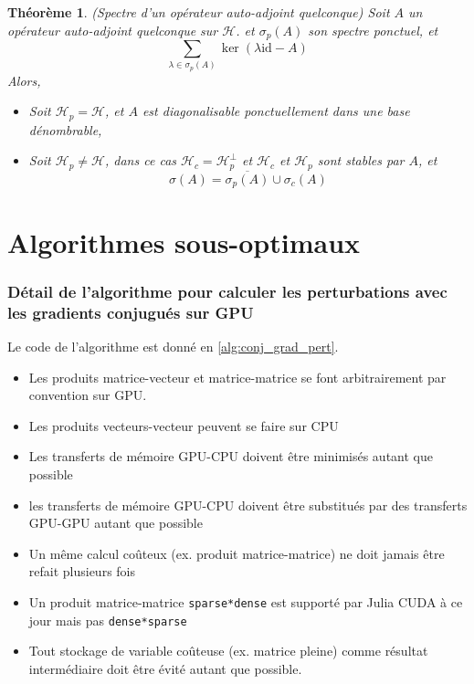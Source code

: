 \documentclass[svgnames,dvipsnames,a4paper,10pt,french]{report}
\newtheorem{theorem}{Théorème}[section]
\begin{document}
\begin{appendices}
\begin{theorem}{(Spectre d'un opérateur auto-adjoint quelconque)}
Soit $A$ un opérateur auto-adjoint quelconque  sur $\mathcal{H}$. et $\sigma_p(A)$ son spectre ponctuel, et
\begin{equation}
    \sum_{\lambda\in\sigma_p(A)} \ker (\lambda \mathrm{id}-A)
\end{equation}
Alors,
\begin{itemize}
    \item Soit $\mathcal{H}_p = \mathcal{H}$, et $A$ est diagonalisable ponctuellement dans une base dénombrable,
    \item Soit $\mathcal{H}_p \neq \mathcal{H}$, dans ce cas $\mathcal{H}_c = \mathcal{H}_p^\perp$ et $\mathcal{H}_c$ et $\mathcal{H}_p$ sont stables par $A$, et 
    \begin{equation}
        \sigma(A) = \overline{\sigma_p(A)} \cup \sigma_c(A)
    \end{equation}
\end{itemize}
\end{theorem}


\chapter{Algorithmes sous-optimaux}

\subsection{Détail de l'algorithme pour calculer les perturbations avec les gradients conjugués sur GPU}

Le code de l'algorithme est donné en \ref{alg:conj_grad_pert}.
\begin{itemize}
    \item Les produits matrice-vecteur et matrice-matrice se font arbitrairement par convention sur GPU.
    \item Les produits vecteurs-vecteur peuvent se faire sur CPU
    \item Les transferts de mémoire GPU-CPU doivent être minimisés autant que possible
    \item les transferts de mémoire GPU-CPU doivent être substitués par des transferts GPU-GPU autant que possible
    \item Un même calcul coûteux (ex. produit matrice-matrice) ne doit jamais être refait plusieurs fois
    \item Un produit matrice-matrice \texttt{sparse*dense} est supporté par Julia CUDA à ce jour mais pas \texttt{dense*sparse}
    \item Tout stockage de variable coûteuse (ex. matrice pleine) comme résultat intermédiaire doit être évité autant que possible.
\end{itemize}




\end{appendices}
\end{document}
